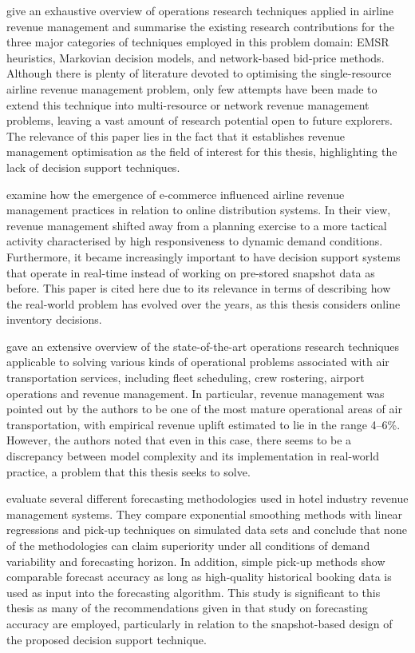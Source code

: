 \citet{PakPiersma2002} give an exhaustive overview of operations research techniques applied in airline revenue management and summarise the existing research contributions for the three major categories of techniques employed in this problem domain: EMSR heuristics, Markovian decision models, and network-based bid-price methods. Although there is plenty of literature devoted to optimising the single-resource airline revenue management problem, only few attempts have been made to extend this technique into multi-resource or network revenue management problems, leaving a vast amount of research potential open to future explorers. The relevance of this paper lies in the fact that it establishes revenue management optimisation as the field of interest for this thesis, highlighting the lack of decision support techniques.

\citet{BoydBilegan2003} examine how the emergence of e-commerce influenced airline revenue management practices in relation to online distribution systems. In their view, revenue management shifted away from a planning exercise to a more tactical activity characterised by high responsiveness to dynamic demand conditions. Furthermore, it became increasingly important to have decision support systems that operate in real-time instead of working on pre-stored snapshot data as before. This paper is cited here due to its relevance in terms of describing how the real-world problem has evolved over the years, as this thesis considers online inventory decisions.

\citet{BarnhartBelobabaOdoni2003} gave an extensive overview of the state-of-the-art operations research techniques applicable to solving various kinds of operational problems associated with air transportation services, including fleet scheduling, crew rostering, airport operations and revenue management. In particular, revenue management was pointed out by the authors to be one of the most mature operational areas of air transportation, with empirical revenue uplift estimated to lie in the range 4--6\%. However, the authors noted that even in this case, there seems to be a discrepancy between model complexity and its implementation in real-world practice, a problem that this thesis seeks to solve.

\citet{WeatherfordKimes2003} evaluate several different forecasting methodologies used in hotel industry revenue management systems. They compare exponential smoothing methods with linear regressions and pick-up techniques on simulated data sets and conclude that none of the methodologies can claim superiority under all conditions of demand variability and forecasting horizon. In addition, simple pick-up methods show comparable forecast accuracy as long as high-quality historical booking data is used as input into the forecasting algorithm. This study is significant to this thesis as many of the recommendations given in that study on forecasting accuracy are employed, particularly in relation to the snapshot-based design of the proposed decision support technique.

